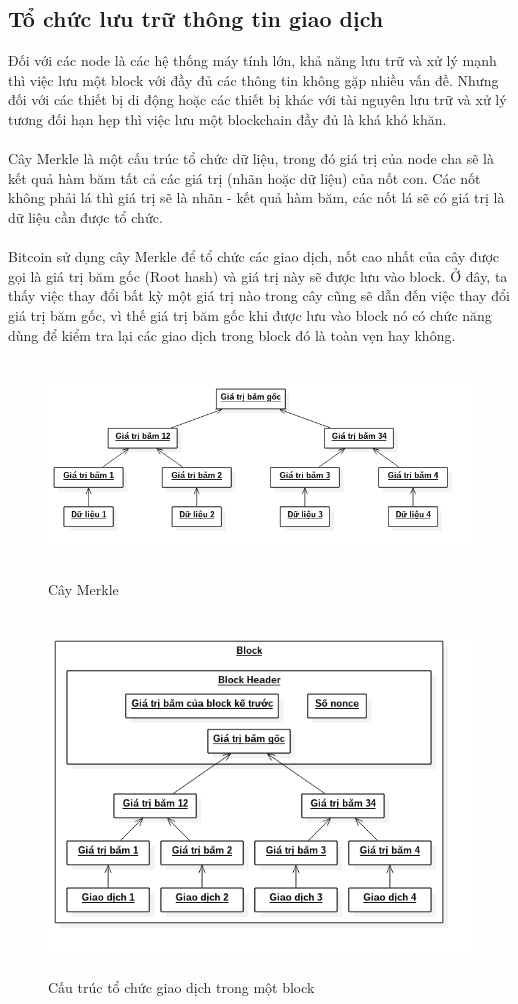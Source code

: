 \subsection{Tổ chức lưu trữ thông tin giao dịch}
Đối với các node là các hệ thống máy tính lớn, khả năng lưu trữ và xử lý mạnh thì 
việc lưu một block với đầy đủ các thông tin không gặp nhiều vấn đề. Nhưng đối 
với các thiết bị di động hoặc các thiết bị khác với tài nguyên lưu trữ và xử lý 
tương đối hạn hẹp thì việc lưu một blockchain đầy đủ là khá khó khăn.\\\\
Cây Merkle là một cấu trúc tổ chức dữ liệu, trong đó giá trị của node cha sẽ 
là kết quả hàm băm tất cả các giá trị (nhãn hoặc dữ liệu) của nốt con. Các nốt 
không phải lá thì giá trị sẽ là nhãn - kết quả hàm băm, các nốt lá sẽ có giá trị 
là dữ liệu cần được tổ chức.\\\\
Bitcoin sử dụng cây Merkle để tổ chức các giao dịch, nốt cao nhất của cây được 
gọi là giá trị băm gốc (Root hash) và giá trị này sẽ được lưu vào block. Ở đây,
ta thấy việc thay đổi bất kỳ một giá trị nào trong cây cũng sẽ dẫn đến việc thay 
đổi giá trị băm gốc, vì thế giá trị băm gốc khi được lưu vào block nó có chức 
năng dùng để kiểm tra lại các giao dịch trong block đó là toàn vẹn hay không.\\
\begin{figure}[h!]
\centering
\includegraphics[height=2.25in, keepaspectratio=true]{merkletree.png}
\caption{Cây Merkle}
\end{figure}
\begin{figure}[h!]
\centering
\includegraphics[height=3.75in, keepaspectratio=true]{block.png}
\caption{Cấu trúc tổ chức giao dịch trong một block}
\end{figure}\\
